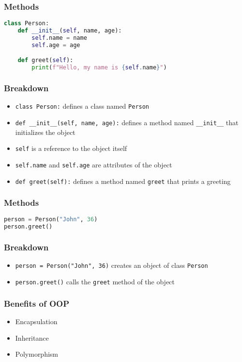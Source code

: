 \documentclass[serif, 9pt, aspectratio=32]{beamer}
\begin{document}
\begin{frame}[fragile]
    \frametitle{Methods}
    \begin{lstlisting}[language=Python]
class Person:
    def __init__(self, name, age):
        self.name = name
        self.age = age

    def greet(self):
        print(f"Hello, my name is {self.name}")
    \end{lstlisting}
\end{frame}

\begin{frame}
    \centering
    \frametitle{Breakdown}
    \begin{itemize}
        \setlength{\itemsep}{2em}
        \item \texttt{class Person:} defines a class named \texttt{Person}
        \item \texttt{def \_\_init\_\_(self, name, age):} defines a method named \texttt{\_\_init\_\_} that initializes the object
        \item \texttt{self} is a reference to the object itself
        \item \texttt{self.name} and \texttt{self.age} are attributes of the object
        \item \texttt{def greet(self):} defines a method named \texttt{greet} that prints a greeting
    \end{itemize}
\end{frame}

\begin{frame}[fragile]
    \frametitle{Methods}
    \begin{lstlisting}[language=Python]
person = Person("John", 36)
person.greet()
    \end{lstlisting}
\end{frame}

\begin{frame}
    \centering
    \frametitle{Breakdown}
    \begin{itemize}
        \setlength{\itemsep}{2em}
        \item \texttt{person = Person("John", 36)} creates an object of class \texttt{Person}
        \item \texttt{person.greet()} calls the \texttt{greet} method of the object
    \end{itemize}
\end{frame}

\begin{frame}
    \centering
    \frametitle{Benefits of OOP}
    \begin{itemize}
        \setlength{\itemsep}{2em}
        \item Encapsulation
        \item Inheritance
        \item Polymorphism
    \end{itemize}
\end{frame}
\end{document}
